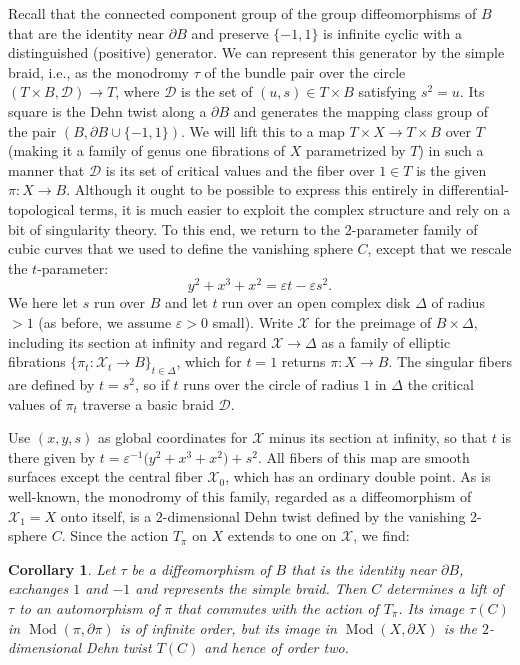\documentclass[10pt,letterpaper]{amsart}
\numberwithin{equation}{section}
\newcommand{\eps}{\varepsilon}
\newcommand{\p}{\partial}
\def\Xcal{{\mathcal X}}
\def\Dscr{{\mathscr D}}
\newcommand\Mod{\operatorname{Mod}}
\newtheorem{corollary}[theorem]{Corollary}
\theoremstyle{remark}
\begin{document}
Recall that the  connected component group of the group diffeomorphisms of $B$  that are the identity near $\p B$ and preserve $\{-1,1\}$ is infinite cyclic with a distinguished (positive) generator. We can  represent this generator by the simple braid, i.e.,  as  the 
monodromy $\tau$ of the  bundle pair over the circle $(T\times B, \Dscr)\to T$, where  $\Dscr$ is the set of $(u,s)\in T\times B$ satisfying $s^2=u$. Its square  is the Dehn twist along a $\p B$ and  generates the mapping class group of the pair 
$(B, \p B\cup \{-1,1\})$.
We will lift this to a map $T\times X\to T\times B$ over $T$  (making it a family of genus one fibrations of $X$ parametrized by $T$) in such a manner that $\Dscr$ 
is its set of critical values  and the fiber over $1\in T$ is the given $\pi: X\to B$. Although it ought to be possible to express this entirely in 
differential-topological terms, it is much easier to exploit the complex structure and rely on a bit of singularity theory. To this end, we return to the 2-parameter family of cubic curves that we used to define the vanishing sphere $C$, except that we rescale the $t$-parameter:
 \[
y^2+x^3+x^2 =\eps t-\eps  s^2. 
\]
We here let $s$ run over $B$ and let $t$ run over an open complex  disk $\Delta$ of radius $>1$ (as before, we assume  $\eps >0$ small). Write $\Xcal$  for the preimage 
of $B\times \Delta$, including its section at infinity and regard $\Xcal\to \Delta$ as a family of elliptic fibrations
$\{\pi_t:\Xcal_t\to B\}_{t\in \Delta}$, which for $t=1$ returns $\pi :X\to B$.
The singular fibers are defined by $t=s^2$, so if $t$ runs over the circle of radius $1$ in $\Delta$ the critical values of $\pi_t$ traverse a basic braid $\Dscr$. 

Use $(x,y,s)$ as global coordinates for $\Xcal$ minus its section at infinity, so that $t$ is there given by
$t=\eps ^{-1}\big(y^2+x^3+x^2) + s^2$.
All fibers of this map are smooth surfaces except the  central fiber $\Xcal_0$,  which  has an ordinary double point.
As is well-known, the monodromy of this family, regarded as a diffeomorphism of $\Xcal_1 =X$ onto itself,  is a $2$-dimensional Dehn twist defined by the vanishing 2-sphere $C$. Since the  action $T_\pi$ on $X$ extends  
to one on $\Xcal$, we find:


\begin{corollary}\label{cor:2Dehn}
Let $\tau$ be a diffeomorphism of $B$ that is the identity near $\p B$,  exchanges $1$ and $-1$ and represents the simple braid. Then $C$ determines a lift of $\tau$  to an automorphism of $\pi$ that commutes with the action of $T_\pi$.
Its image $\tau(C)$ in $\Mod(\pi, \p\pi)$ is of infinite order, but  its image in $\Mod(X, \p X)$
is the $2$-dimensional Dehn twist $T(C)$ and hence of order two. 
\end{corollary}
\end{document}

